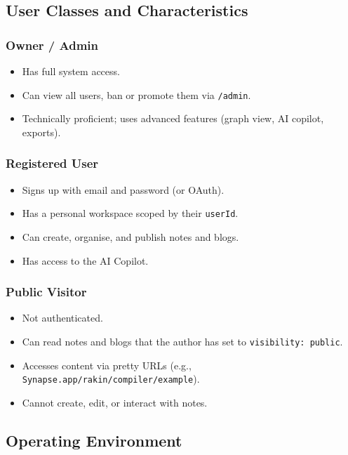 \documentclass[12pt, a4paper]{article}
\begin{document}
\subsection{User Classes and Characteristics}

\subsubsection{Owner / Admin}

\begin{itemize}[leftmargin=2em]
  \item Has full system access.
  \item Can view all users, ban or promote them via \texttt{/admin}.
  \item Technically proficient; uses advanced features (graph view, AI
        copilot, exports).
\end{itemize}

\subsubsection{Registered User}

\begin{itemize}[leftmargin=2em]
  \item Signs up with email and password (or OAuth).
  \item Has a personal workspace scoped by their \texttt{userId}.
  \item Can create, organise, and publish notes and blogs.
  \item Has access to the AI Copilot.
\end{itemize}

\subsubsection{Public Visitor}

\begin{itemize}[leftmargin=2em]
  \item Not authenticated.
  \item Can read notes and blogs that the author has set to
        \texttt{visibility: public}.
  \item Accesses content via pretty URLs (e.g.,
        \texttt{Synapse.app/rakin/compiler/example}).
  \item Cannot create, edit, or interact with notes.
\end{itemize}

\subsection{Operating Environment}
\end{document}
